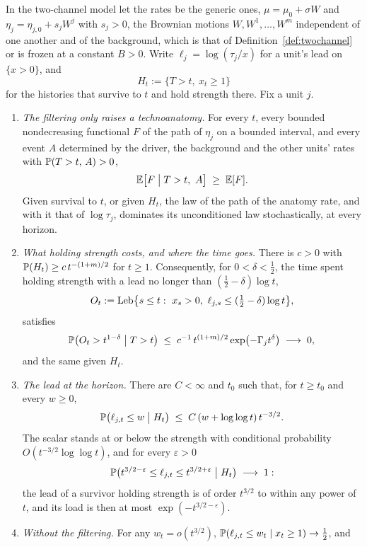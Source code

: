 \begin{theorem}\label{thm:pace}
In the two-channel model let the rates be the generic ones,
$\mu=\mu_0+\sigma W$ and $\eta_j=\eta_{j,0}+s_jW^j$ with $s_j>0$, the
Brownian motions $W,W^1,\dots,W^m$ independent of one another and of the
background, which is that of Definition~\ref{def:twochannel} or is frozen
at a constant $B>0$. Write $\ell_j=\log(\tau_j/x)$ for a unit's lead on
$\{x>0\}$, and
\[
H_t:=\{T>t,\ x_t\ge1\}
\]
for the histories that survive to $t$ and hold strength there. Fix a
unit $j$.
\begin{enumerate}[label=\emph{(\roman*)},itemsep=1pt]
\item \emph{The filtering only raises a technoanatomy.} For every $t$,
every bounded nondecreasing functional $F$ of the path of $\eta_j$ on a
bounded interval, and every event $A$ determined by the driver, the
background and the other units' rates with $\mathbb{P}(T>t,\,A)>0$,
\[
\E\bigl[F\bigm|T>t,\ A\bigr]\;\ge\;\E[F].
\]
Given survival to $t$, or given $H_t$, the law of the path of the anatomy
rate, and with it that of $\log\tau_j$, dominates its unconditioned law
stochastically, at every horizon.
\item \emph{What holding strength costs, and where the time goes.} There
is $c>0$ with $\mathbb{P}(H_t)\ge c\,t^{-(1+m)/2}$ for $t\ge1$. Consequently, for
$0<\delta<\tfrac12$, the time spent holding strength with a lead no
longer than $(\tfrac12-\delta)\log t$,
\[
O_t:=\Leb\bigl\{s\le t:\ x_s>0,\ \ell_{j,s}\le(\tfrac12-\delta)\log t\bigr\},
\]
satisfies
\[
\mathbb{P}\bigl(O_t>t^{1-\delta}\bigm|T>t\bigr)\;\le\;
c^{-1}\,t^{(1+m)/2}\exp\bigl(-\Gamma_jt^{\delta}\bigr)\;\longrightarrow\;0,
\]
and the same given $H_t$.
\item \emph{The lead at the horizon.} There are $C<\infty$ and $t_0$ such
that, for $t\ge t_0$ and every $w\ge0$,
\begin{equation}\label{eq:pace}
\mathbb{P}\bigl(\ell_{j,t}\le w\bigm|H_t\bigr)\;\le\;C\,(w+\log\log t)\,t^{-3/2}.
\end{equation}
The scalar stands at or below the strength with conditional probability
$O(t^{-3/2}\log\log t)$, and for every $\varepsilon>0$
\[
\mathbb{P}\bigl(t^{3/2-\varepsilon}\le\ell_{j,t}\le t^{3/2+\varepsilon}\bigm|H_t\bigr)\;\longrightarrow\;1:
\]
the lead of a survivor holding strength is of order $t^{3/2}$ to within
any power of $t$, and its load is then at most
$\exp(-t^{3/2-\varepsilon})$.
\item \emph{Without the filtering.} For any $w_t=o(t^{3/2})$,
$\mathbb{P}(\ell_{j,t}\le w_t\mid x_t\ge1)\to\tfrac12$, and

\end{enumerate}
\end{theorem}
